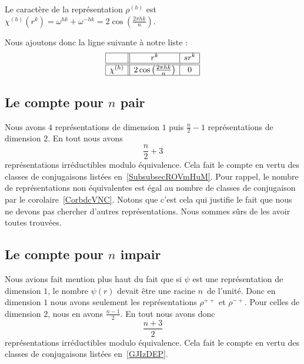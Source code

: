 Le caractère de la représentation \( \rho^{(h)}\) est \( \chi^{(h)}(r^k)=\omega^{hk}+\omega^{-hk}=2\cos\left( \frac{ 2\pi hk }{ n } \right)\).

Nous ajoutons donc la ligne suivante à notre liste :
\begin{equation*}
	\begin{array}[]{|c||c|c|}
		\hline
		           & r^k                                       & sr^k \\
		\hline\hline
		\chi^{(h)} & 2\cos\left( \frac{ 2\pi hk }{ n } \right) & 0    \\
		\hline
	\end{array}
\end{equation*}

\subsection{Le compte pour \texorpdfstring{\(  n\)}{n} pair}

Nous avons \( 4\) représentations de dimension \( 1\) puis \( \frac{ n }{2}-1\) représentations de dimension \( 2\). En tout nous avons
\begin{equation}
	\frac{ n }{2}+3
\end{equation}
représentations irréductibles modulo équivalence. Cela fait le compte en vertu des classes de conjugaisons listées en~\ref{SubsubsecROVmHuM}. Pour rappel, le nombre de représentations non équivalentes est égal au nombre de classes de conjugaison par le corolaire~\ref{CorbdcVNC}. Notons que c'est cela qui justifie le fait que nous ne devons pas chercher d'autres représentations. Nous sommes sûrs de les avoir toutes trouvées.

\subsection{Le compte pour \texorpdfstring{\(  n\)}{n} impair}

Nous avions fait mention plus haut du fait que si \( \psi\) est une représentation de dimension \( 1\), le nombre \( \psi(r)\) devait être une racine \( n\)\ieme\ de l'unité. Donc en dimension \( 1\) nous avons seulement les représentations \( \rho^{++}\) et \( \rho^{-+}\). Pour celles de dimension \( 2\), nous en avons \( \frac{ n-1 }{2}\). En tout nous avons donc
\begin{equation}
	\frac{ n+3 }{2}
\end{equation}
représentations irréductibles modulo équivalence. Cela fait le compte en vertu des classes de conjugaisons listées en~\ref{GJIzDEP}.
